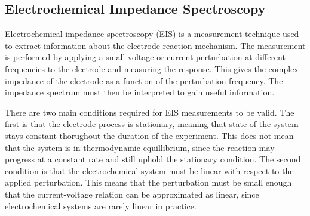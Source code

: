 \subsection{Electrochemical Impedance Spectroscopy}


Electrochemical impedance spectroscopy (EIS) is a measurement technique used to extract information about the electrode reaction mechanism. The measurement is performed by applying a small voltage or current perturbation at different frequencies to the electrode and measuring the response. This gives the complex impedance of the electrode as a function of the perturbation frequency. The impedance spectrum must then be interpreted to gain useful information.

There are two main conditions required for EIS measurements to be valid. The first is that the electrode process is stationary, meaning that state of the system stays constant thorughout the duration of the experiment. This does not mean that the system is in thermodynamic equillibrium, since the reaction may progress at a constant rate and still uphold the stationary condition. The second condition is that the electrochemical system must be linear with respect to the applied perturbation. This means that the perturbation must be small enough that the current-voltage relation can be approximated as linear, since electrochemical systems are rarely linear in practice. 







